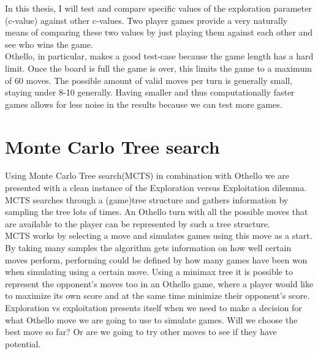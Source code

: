 \documentclass[11pt,a4paper]{article}
\begin{document}
In this thesis, I will test and compare specific values of the exploration parameter (c-value) against other c-values. Two player games provide a very naturally means of comparing these two values by just playing them against each other and see who wins the game.\\
Othello, in particular, makes a good test-case because the game length has a hard limit. Once the board is full the game is over, this limits the game to a maximum of 60 moves. The possible amount of valid moves per turn is generally small, staying under 8-10 generally. Having smaller and thus computationally faster games allows for less noise in the results because we can test more games.

\section{Monte Carlo Tree search}
Using Monte Carlo Tree search(MCTS) in combination with Othello we are presented with a clean instance of the Exploration versus Exploitation dilemma. MCTS searches through a (game)tree structure and gathers information by sampling the tree lots of times. An Othello turn with all the possible moves that are available to the player can be represented by such a tree structure.\\ MCTS works by selecting a move and simulates games using this move as a start. By taking many samples the algorithm gets information on how well certain moves perform, performing could be defined by how many games have been won when simulating using a certain move.  Using a minimax tree it is possible to represent the opponent's moves too in an Othello game, where a player would like to maximize its own score and at the same time minimize their opponent's score. 
Exploration vs exploitation presents itself when we need to make a decision for what Othello move we are going to use to simulate games. Will we choose the best move so far? Or are we going to try other moves to see if they have potential.
\end{document}
